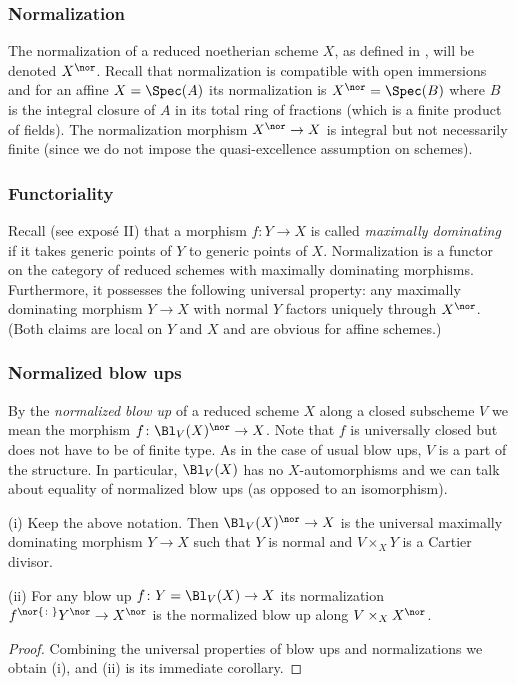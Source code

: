 \documentclass[10pt]{../fichiers-configuration-latex/smfart}
\begin{document}
\subsubsection{Normalization}\label{8-normsec} The normalization of
a reduced noetherian scheme $X$, as defined in ,
will be denoted $X^\nor$. Recall that normalization is compatible
with open immersions and for an affine $X=\Spec(A)$ its normalization
is $X^\nor=\Spec(B)$ where $B$ is the integral closure of $A$
in its total ring of fractions (which is a finite product of
fields). The normalization morphism $X^\nor\to X$ is integral but
not necessarily finite (since we do not impose the quasi-excellence
assumption on schemes).

\subsubsection{Functoriality}\label{8-functornormsec} Recall
(see expos\'e II) that a morphism $f{\colon}Y\to X$ is called
{\em maximally dominating} if it takes generic points of $Y$ to
generic points of $X$. Normalization is a functor on the category of
reduced schemes with maximally dominating morphisms. Furthermore,
it possesses the following universal property: any maximally
dominating morphism $Y\to X$ with normal $Y$ factors uniquely
through $X^\nor$. (Both claims are local on $Y$ and $X$ and are
obvious for affine schemes.)

\subsubsection{Normalized blow ups}\label{8-normblowsec} By the {\em
normalized blow up} of a reduced scheme $X$ along a closed subscheme
$V$ we mean the morphism $f{\colon}\Bl_V(X)^\nor\to X$. Note that $f$
is universally closed but does not have to be of finite type. As
in the case of usual blow ups, $V$ is a part of the structure. In
particular, $\Bl_V(X)$ has no $X$-automorphisms and we can talk
about equality of normalized blow ups (as opposed to an isomorphism).

\begin{proposition2}\label{8-normblowprop} (i) Keep the above
notation. Then $\Bl_V(X)^\nor\to X$ is the universal maximally
dominating morphism $Y\to X$ such that $Y$ is normal and $V\times_XY$
is a Cartier divisor.

(ii) For any blow up $f{\colon}Y=\Bl_V(X)\to X$ its normalization
$f^\nor{\colon}Y^\nor\to X^\nor$ is the normalized blow up along
$V\times_XX^\nor$.  \end{proposition2} \begin{proof} Combining the
universal properties of blow ups and normalizations we obtain (i),
and (ii) is its immediate corollary.  \end{proof}
\end{document}
